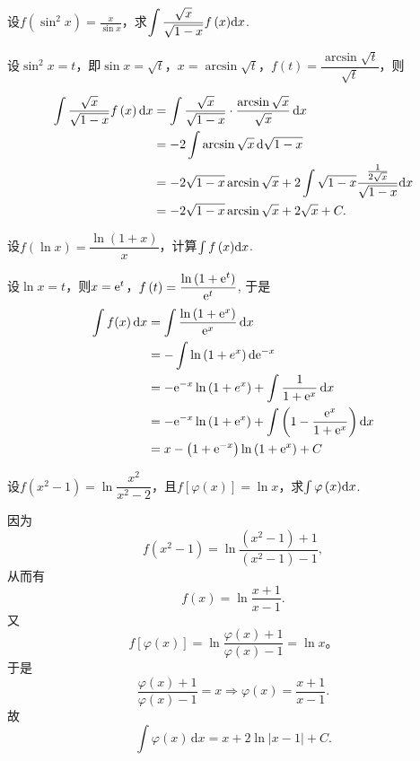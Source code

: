 \begin{problem}
	设$\displaystyle f\left( \sin^{2}x \right) = \frac{x}{\sin x}$，求$\displaystyle \int{\frac{\sqrt{x}}{\sqrt{1 - x}}f\left( x \right)}{\mathop{}\!\mathrm{d}x}$.
	
	\begin{solution}
		设$\sin^{2}x = t$，即$\sin x = \sqrt{t}$，$x = \arcsin\sqrt{t}$，$f\left( t \right) = \dfrac{\arcsin\sqrt{t}}{\sqrt{t}}$，则
	
	$$\begin{aligned}
	\int{\frac{\sqrt{x}}{\sqrt{1 - x}}f\left( x \right)}\dx 
	& = \int \frac{\sqrt{x}}{\sqrt{1 - x}} \cdot \frac{\arcsin\sqrt{x}}{\sqrt{x}}\dx\\
	& = - 2\int {\arcsin\sqrt{x}}\d\sqrt{1 - x}\\
	& = - 2\sqrt{1 - x}\arcsin\sqrt{x} + 2\int {\sqrt{1 - x}\frac{\frac{1}{2\sqrt{x}}}{\sqrt{1 - x}}}{\dx}\\
	& = - 2\sqrt{1 - x}\arcsin\sqrt{x} + 2\sqrt{x} + C.\end{aligned}$$
	\end{solution}
\end{problem}

\begin{problem}
	设$f\left( \ln x \right) = \dfrac{\ln\left( 1 + x \right)}{x}$，计算$\int{f\left( x \right)}{\mathop{}\!\mathrm{d}x}$.
	
		\begin{solution}
	设$\ln x = t$，则$x = \mathrm{e}^{t}$，$f\left( t \right) = \dfrac{\ln\left( 1 + \mathrm{e}^{t} \right)}{\mathrm{e}^{t}}$, 于是
		$$\begin{aligned} 
		\int f(x) \d x &=\int \frac{\ln \left(1+\e^{x}\right)}{\e^{x}} \d x\\
		&=-\int \ln \left(1+e^{x}\right) \d \e^{-x} \\ 
		&=-\e^{-x} \ln \left(1+e^{x}\right)+\int \frac{1}{1+\e^{x}} \d x \\ 
		&=-\e^{-x} \ln \left(1+\e^{x}\right)+\int\left(1-\frac{\e^{x}}{1+\e^{x}}\right) \d x \\ &=x-\left(1+\e^{-x}\right) \ln \left(1+\e^{x}\right)+C 
		\end{aligned}$$
	\end{solution}
\end{problem}

\begin{problem}
	设$f\left( x^{2} - 1 \right) = \ln\dfrac{x^{2}}{x^{2} - 2}$，且$f\left\lbrack \varphi\left( x \right) \right\rbrack = \ln x$，求$\int {\varphi\left( x \right)}{\mathop{}\!\mathrm{d}x}$.
	
	\begin{solution}
		因为
		$$ f\left( x^{2} - 1 \right) = \ln\dfrac{\left( x^{2} - 1 \right) + 1}{\left( x^{2} - 1 \right) - 1},$$从而有$$f\left( x \right) = \ln\dfrac{x + 1}{x - 1}.$$ 又
	$$f\left\lbrack \varphi\left( x \right) \right\rbrack = \ln\dfrac{\varphi\left( x \right) + 1}{\varphi\left( x \right) - 1} = \ln x。$$
	于是
	$$\frac{\varphi\left( x \right) + 1}{\varphi\left( x \right) - 1} = x \Rightarrow \varphi\left( x \right) = \frac{x + 1}{x - 1}.$$
	故
	$$\int\varphi(x)\,\mathrm{d}x = x + 2\ln\left| x - 1 \right| + C.$$
	\end{solution}
\end{problem}



